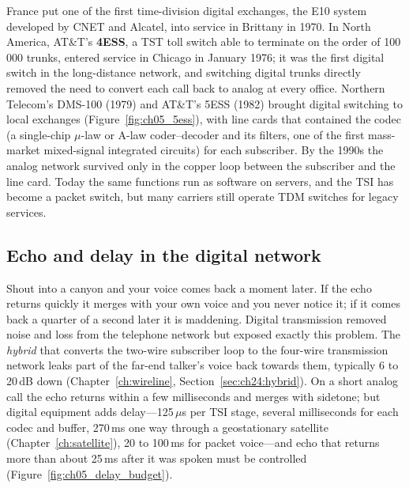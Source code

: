 
\begin{inpractice}
France put one of the first time-division digital exchanges, the E10 system developed by CNET
and Alcatel, into service in Brittany in 1970. In North America, AT\&T's \textbf{4ESS}, a TST
toll switch able to terminate on the order of 100\,000 trunks, entered service in Chicago in
January 1976; it was the first digital switch in the long-distance network, and switching digital
trunks directly removed the need to convert each call back to analog at every office. Northern
Telecom's DMS-100 (1979) and AT\&T's 5ESS (1982) brought digital switching to local exchanges
(Figure~\ref{fig:ch05_5ess}), with line cards that contained the codec (a single-chip $\mu$-law or
A-law coder--decoder and its filters, one of the first mass-market mixed-signal integrated circuits)
for each subscriber. By the 1990s the analog network survived only in the copper loop between the
subscriber and the line card. Today the same functions run as software on servers, and the TSI has
become a packet switch, but many carriers still operate TDM switches for legacy services.
\end{inpractice}

\subsection{Echo and delay in the digital network}

Shout into a canyon and your voice comes back a moment later. If the echo returns quickly it merges
with your own voice and you never notice it; if it comes back a quarter of a second later it is
maddening. Digital transmission removed noise and loss from the telephone network but exposed
exactly this problem. The \emph{hybrid} that converts the two-wire subscriber loop to the four-wire
transmission network leaks part of the far-end talker's voice back towards them, typically 6 to
20\,dB down (Chapter~\ref{ch:wireline}, Section~\ref{sec:ch24:hybrid}). On a short analog call the
echo returns within a few milliseconds and merges with sidetone; but digital equipment adds
delay---125\,$\mu$s per TSI stage, several milliseconds for each codec and buffer, 270\,ms one way
through a geostationary satellite (Chapter~\ref{ch:satellite}), 20 to 100\,ms for packet
voice---and echo that returns more than about 25\,ms after it was spoken must be controlled
(Figure~\ref{fig:ch05_delay_budget}).

